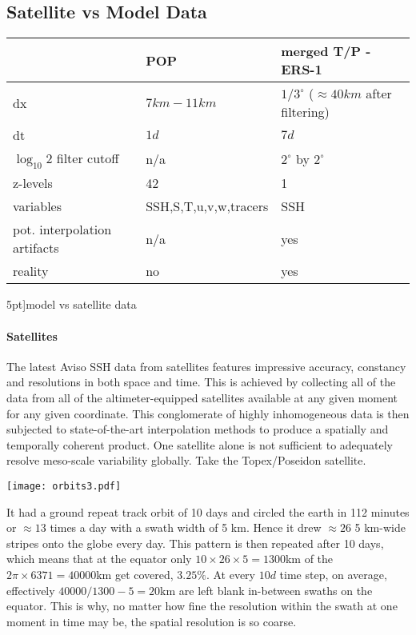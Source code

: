 
\subsection{Satellite vs Model Data} \label{subsec:satvsmod}

\begin{margintable}
\begin{tabularx}{\textwidth}{ |X|X|X| }
  \hline
   & \bf{POP} & \bf{merged T/P - ERS-1 }  \\
  \hline
  dx & $7km-11km$  & $1/3^{\circ}$ ($\approx 40 km$ after filtering)  \\
  \hline
  dt & $1d$  & $7d$  \\
  \hline
  $\log_{10}2$ filter cutoff & n/a  & $2^{\circ} $ by $ 2^{\circ} $  \\
  \hline
  z-levels & 42  & 1  \\
  \hline
  variables & SSH,S,T,u,v,w,tracers  & SSH  \\
  \hline
	pot. interpolation artifacts & n/a  & yes  \\
  \hline
	reality & no  & yes  \\
  \hline
\end{tabularx}
\caption[model vs satellite][5pt]{model vs satellite data}
\label{table:modVSsat}
\end{margintable}

\paragraph{Satellites}The latest Aviso SSH data from satellites features impressive accuracy, constancy and resolutions in both space and time. This is achieved
by collecting all of the data from all of the altimeter-equipped satellites available at any given moment for any given coordinate. This conglomerate of highly
inhomogeneous data is then subjected to state-of-the-art interpolation methods to produce a spatially and temporally coherent product. One satellite alone is
not sufficient to adequately resolve meso-scale variability globally. Take \eg the Topex/Poseidon satellite.
\begin{marginfigure}
\texttt{[image: orbits3.pdf]}
\end{marginfigure}
It had a ground repeat track orbit of 10 days and circled the earth in 112 minutes or $\approx 13$ times a day with a swath width of 5 km. Hence it drew $\approx 26$ 5 km-wide stripes onto the globe every day.
This pattern is then repeated after 10 days, which means that at the equator only $10 \times 26 \times 5=1300$km of the $2\pi \times 6371=40000$km get covered,
\ie $3.25\%$. At every $10d$ time step, on average, effectively
$40000/1300-5= 20$km are left blank in-between swaths on the equator. This is why, no matter how fine the resolution within the swath at one moment in time may
be, the spatial resolution is so coarse.

